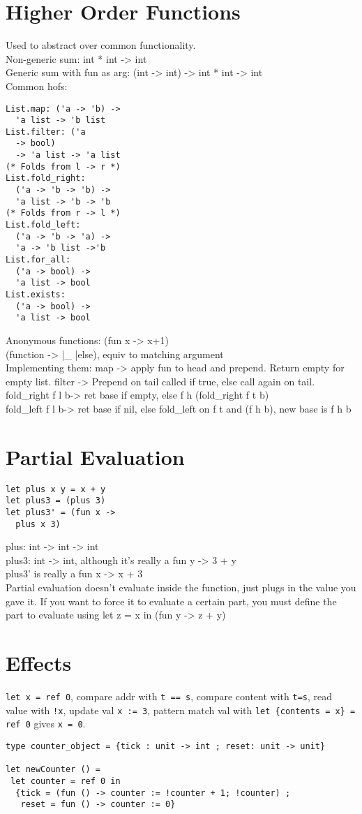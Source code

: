 \section{Higher Order Functions}
Used to abstract over common functionality.
\\Non-generic sum: int * int -> int
\\Generic sum with fun as arg: (int -> int) -> int * int -> int
\\ Common hofs:
\begin{lstlisting}
List.map: ('a -> 'b) ->
  'a list -> 'b list
List.filter: ('a
  -> bool)
  -> 'a list -> 'a list
(* Folds from l -> r *)
List.fold_right:
  ('a -> 'b -> 'b) ->
  'a list -> 'b -> 'b
(* Folds from r -> l *)
List.fold_left:
  ('a -> 'b -> 'a) ->
  'a -> 'b list ->'b
List.for_all:
  ('a -> bool) ->
  'a list -> bool
List.exists:
  ('a -> bool) ->
  'a list -> bool
\end{lstlisting}
Anonymous functions: (fun x -> x+1)
\\ (function -> |\_ |else), equiv to matching argument
\\ Implementing them: map -> apply fun to head and prepend. Return
empty for empty list. filter -> Prepend on tail called if true, else
call again on tail.
\\fold\_right f l b-> ret base if empty, else f h
(fold\_right f t b)
\\fold\_left f l b-> ret base if nil, else fold\_left on f t and (f h b), new
base is f h b
\color{Plum}
\section{Partial Evaluation}
\begin{lstlisting}
let plus x y = x + y
let plus3 = (plus 3)
let plus3' = (fun x ->
  plus x 3)
\end{lstlisting}
plus: int -> int -> int
\\plus3: int -> int, although it's really a fun y -> 3 + y
\\plus3' is really a fun x -> x + 3
\\ Partial evaluation doesn't evaluate inside the function, just plugs
in the value you gave it. If you want to force it to evaluate a
certain part, you must define the part to evaluate using let z = x in
(fun y -> z + y)
\color{Blue}
\section{Effects}
\texttt{let x = ref 0}, compare addr with \texttt{t == s}, compare
content with \texttt{t=s}, read value with \texttt{!x}, update val
\texttt{x := 3}, pattern match val with \texttt{let \{contents = x\} =
ref 0} gives \texttt{x = 0}. 
\begin{lstlisting}
type counter_object = {tick : unit -> int ; reset: unit -> unit}

let newCounter () =
 let counter = ref 0 in 
  {tick = (fun () -> counter := !counter + 1; !counter) ; 
   reset = fun () -> counter := 0}
\end{lstlisting}
\color{Brown}
